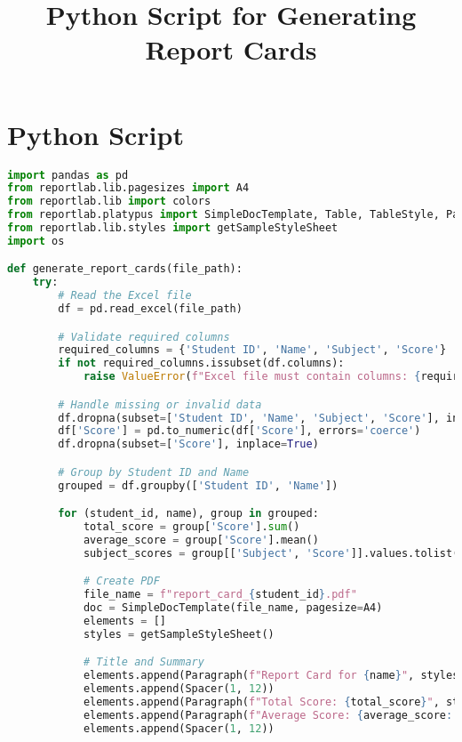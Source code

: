 \documentclass{article}
\title{Python Script for Generating Report Cards}
\author{}
\date{}
\begin{document}
\maketitle

\section*{Python Script}

\begin{lstlisting}[language=Python, caption=Python Script for Generating Report Cards]
import pandas as pd
from reportlab.lib.pagesizes import A4
from reportlab.lib import colors
from reportlab.platypus import SimpleDocTemplate, Table, TableStyle, Paragraph, Spacer
from reportlab.lib.styles import getSampleStyleSheet
import os

def generate_report_cards(file_path):
    try:
        # Read the Excel file
        df = pd.read_excel(file_path)

        # Validate required columns
        required_columns = {'Student ID', 'Name', 'Subject', 'Score'}
        if not required_columns.issubset(df.columns):
            raise ValueError(f"Excel file must contain columns: {required_columns}")

        # Handle missing or invalid data
        df.dropna(subset=['Student ID', 'Name', 'Subject', 'Score'], inplace=True)
        df['Score'] = pd.to_numeric(df['Score'], errors='coerce')
        df.dropna(subset=['Score'], inplace=True)

        # Group by Student ID and Name
        grouped = df.groupby(['Student ID', 'Name'])

        for (student_id, name), group in grouped:
            total_score = group['Score'].sum()
            average_score = group['Score'].mean()
            subject_scores = group[['Subject', 'Score']].values.tolist()

            # Create PDF
            file_name = f"report_card_{student_id}.pdf"
            doc = SimpleDocTemplate(file_name, pagesize=A4)
            elements = []
            styles = getSampleStyleSheet()

            # Title and Summary
            elements.append(Paragraph(f"Report Card for {name}", styles['Title']))
            elements.append(Spacer(1, 12))
            elements.append(Paragraph(f"Total Score: {total_score}", styles['Normal']))
            elements.append(Paragraph(f"Average Score: {average_score:.2f}", styles['Normal']))
            elements.append(Spacer(1, 12))


\end{lstlisting}
\end{document}
